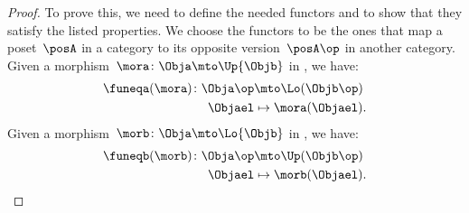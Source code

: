 \begin{proof}
To prove this, we need to define the needed functors and to show that they satisfy the listed properties.
We choose the functors to be the ones that map a poset~$\posA$ in a category to its opposite version~$\posA\op$ in another category.
Given a morphism~$\mora\colon \Obja \mto \Up{\Objb}$ in \UPos, we have:
\begin{equation*}
    \begin{aligned}
    \funeqa(\mora)\colon \Obja\op &\mto \Lo(\Objb \op)\\
    \Objael&\mapsto \mora(\Objael).
    \end{aligned}
\end{equation*}
Given a morphism~$\morb\colon \Obja \mto \Lo{\Objb}$ in \LPos, we have:
\begin{equation*}
    \begin{aligned}
    \funeqb(\morb)\colon \Obja\op &\mto \Up(\Objb \op)\\
    \Objael&\mapsto \morb(\Objael).
    \end{aligned}
\end{equation*}

\end{proof}
